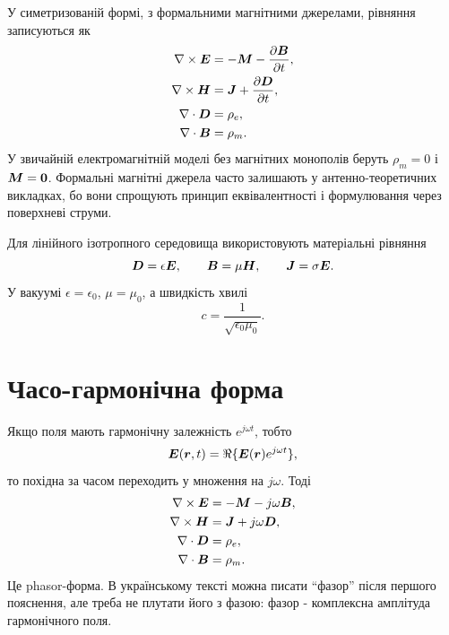 У симетризованій формі, з формальними магнітними джерелами, рівняння записуються як
\begin{subequations}
\begin{align}
\nabla\times\bm{E} &= -\bm{M} - \frac{\partial \bm{B}}{\partial t},\\
\nabla\times\bm{H} &= \bm{J} + \frac{\partial \bm{D}}{\partial t},\\
\nabla\cdot\bm{D} &= \rho_e,\\
\nabla\cdot\bm{B} &= \rho_m.
\end{align}
\end{subequations}
У звичайній електромагнітній моделі без магнітних монополів беруть $\rho_m=0$ і $\bm{M}=\bm{0}$. Формальні магнітні джерела часто залишають у антенно-теоретичних викладках, бо вони спрощують принцип еквівалентності і формулювання через поверхневі струми.

Для лінійного ізотропного середовища використовують матеріальні рівняння
\begin{equation}
  \bm{D}=\epsilon \bm{E}, \qquad \bm{B}=\mu \bm{H}, \qquad \bm{J}=\sigma \bm{E}.
\end{equation}
У вакуумі $\epsilon=\epsilon_0$, $\mu=\mu_0$, а швидкість хвилі
\begin{equation}
  c = \frac{1}{\sqrt{\epsilon_0\mu_0}}.
\end{equation}

\section{Часо-гармонічна форма}

Якщо поля мають гармонічну залежність $e^{j\omega t}$, тобто
\begin{equation}
  \bm{E}(\bm{r},t)=\Re\{\bm{E}(\bm{r})e^{j\omega t}\},
\end{equation}
то похідна за часом переходить у множення на $j\omega$. Тоді
\begin{subequations}
\begin{align}
\nabla\times\bm{E} &= -\bm{M} - j\omega \bm{B},\\
\nabla\times\bm{H} &= \bm{J} + j\omega \bm{D},\\
\nabla\cdot\bm{D} &= \rho_e,\\
\nabla\cdot\bm{B} &= \rho_m.
\end{align}
\end{subequations}
Це phasor-форма. В українському тексті можна писати ``фазор'' після першого пояснення, але треба не плутати його з фазою: фазор - комплексна амплітуда гармонічного поля.

